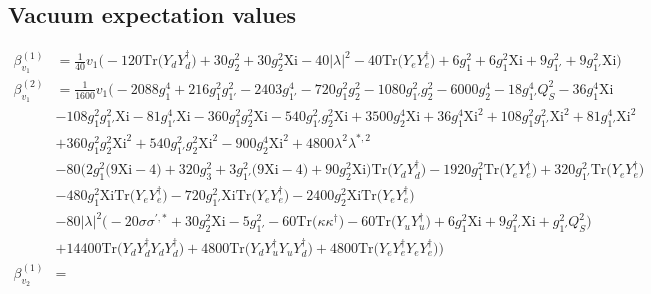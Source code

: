 \subsection{Vacuum expectation values}
{\allowdisplaybreaks  \begin{align} 
\beta_{v_1}^{(1)} & =  
\frac{1}{40} v_1 \Big(-120 \mbox{Tr}\Big({Y_d  Y_{d}^{\dagger}}\Big)  + 30 g_{2}^{2}  + 30 g_{2}^{2} \text{Xi}  -40 |\lambda|^2  -40 \mbox{Tr}\Big({Y_e  Y_{e}^{\dagger}}\Big)  + 6 g_{1}^{2}  + 6 g_{1}^{2} \text{Xi}  + 9 g_{1'}^{2}  + 9 g_{1'}^{2} \text{Xi} \Big)\\ 
\beta_{v_1}^{(2)} & =  
\frac{1}{1600} v_1 \Big(-2088 g_{1}^{4} +216 g_{1}^{2} g_{1'}^{2} -2403 g_{1'}^{4} -720 g_{1}^{2} g_{2}^{2} -1080 g_{1'}^{2} g_{2}^{2} -6000 g_{2}^{4} -18 g_{1'}^{4} Q_{S}^{2} -36 g_{1}^{4} \text{Xi} \nonumber \\ 
 &-108 g_{1}^{2} g_{1'}^{2} \text{Xi} -81 g_{1'}^{4} \text{Xi} -360 g_{1}^{2} g_{2}^{2} \text{Xi} -540 g_{1'}^{2} g_{2}^{2} \text{Xi} +3500 g_{2}^{4} \text{Xi} +36 g_{1}^{4} \text{Xi}^{2} +108 g_{1}^{2} g_{1'}^{2} \text{Xi}^{2} +81 g_{1'}^{4} \text{Xi}^{2} \nonumber \\ 
 &+360 g_{1}^{2} g_{2}^{2} \text{Xi}^{2} +540 g_{1'}^{2} g_{2}^{2} \text{Xi}^{2} -900 g_{2}^{4} \text{Xi}^{2} +4800 \lambda^{2} \lambda^{*,2} \nonumber \\ 
 &-80 \Big(2 g_{1}^{2} \Big(9 \text{Xi}  -4\Big) + 320 g_{3}^{2}  + 3 g_{1'}^{2} \Big(9 \text{Xi}  -4\Big) + 90 g_{2}^{2} \text{Xi} \Big)\mbox{Tr}\Big({Y_d  Y_{d}^{\dagger}}\Big) -1920 g_{1}^{2} \mbox{Tr}\Big({Y_e  Y_{e}^{\dagger}}\Big) +320 g_{1'}^{2} \mbox{Tr}\Big({Y_e  Y_{e}^{\dagger}}\Big) \nonumber \\ 
 &-480 g_{1}^{2} \text{Xi} \mbox{Tr}\Big({Y_e  Y_{e}^{\dagger}}\Big) -720 g_{1'}^{2} \text{Xi} \mbox{Tr}\Big({Y_e  Y_{e}^{\dagger}}\Big) -2400 g_{2}^{2} \text{Xi} \mbox{Tr}\Big({Y_e  Y_{e}^{\dagger}}\Big) \nonumber \\ 
 &-80 |\lambda|^2 \Big(-20 \sigma \sigma^{\prime,*}  + 30 g_{2}^{2} \text{Xi}  -5 g_{1'}^{2}  -60 \mbox{Tr}\Big({\kappa  \kappa^{\dagger}}\Big)  -60 \mbox{Tr}\Big({Y_u  Y_{u}^{\dagger}}\Big)  + 6 g_{1}^{2} \text{Xi}  + 9 g_{1'}^{2} \text{Xi}  + g_{1'}^{2} Q_{S}^{2} \Big)\nonumber \\ 
 &+14400 \mbox{Tr}\Big({Y_d  Y_{d}^{\dagger}  Y_d  Y_{d}^{\dagger}}\Big) +4800 \mbox{Tr}\Big({Y_d  Y_{u}^{\dagger}  Y_u  Y_{d}^{\dagger}}\Big) +4800 \mbox{Tr}\Big({Y_e  Y_{e}^{\dagger}  Y_e  Y_{e}^{\dagger}}\Big) \Big)\\ 
\beta_{v_2}^{(1)} & =  

\end{align}}
